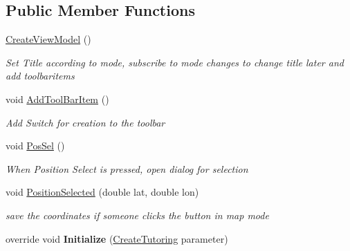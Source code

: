 \subsection*{Public Member Functions}
\begin{DoxyCompactItemize}
\item 
\mbox{\hyperlink{class_tutor_scout24_1_1_view_models_1_1_create_view_model_aa617a300b1411a5a4f28b5b72bf177d6}{Create\+View\+Model}} ()
\begin{DoxyCompactList}\small\item\em Set Title according to mode, subscribe to mode changes to change title later and add toolbaritems \end{DoxyCompactList}\item 
void \mbox{\hyperlink{class_tutor_scout24_1_1_view_models_1_1_create_view_model_afa96e3fde1e926d0bc909a817a8bdaaf}{Add\+Tool\+Bar\+Item}} ()
\begin{DoxyCompactList}\small\item\em Add Switch for creation to the toolbar \end{DoxyCompactList}\item 
void \mbox{\hyperlink{class_tutor_scout24_1_1_view_models_1_1_create_view_model_a5002145ea2bc96424f202caee461f810}{Pos\+Sel}} ()
\begin{DoxyCompactList}\small\item\em When Position Select is pressed, open dialog for selection \end{DoxyCompactList}\item 
void \mbox{\hyperlink{class_tutor_scout24_1_1_view_models_1_1_create_view_model_a07d907ea55e16e56744a3ccf787f9be0}{Position\+Selected}} (double lat, double lon)
\begin{DoxyCompactList}\small\item\em save the coordinates if someone clicks the button in map mode \end{DoxyCompactList}\item 
\mbox{\label{class_tutor_scout24_1_1_view_models_1_1_create_view_model_ab469edfe5a4c4dcb0e7b50ab93572b3d}} 
override void {\bfseries Initialize} (\mbox{\hyperlink{class_tutor_scout24_1_1_models_1_1_tutorings_1_1_create_tutoring}{Create\+Tutoring}} parameter)
\item 
\mbox{\label{class_tutor_scout24_1_1_view_models_1_1_create_view_model_a3081038a79b7da05515b70ac13f91673}} 

\end{DoxyCompactItemize}
